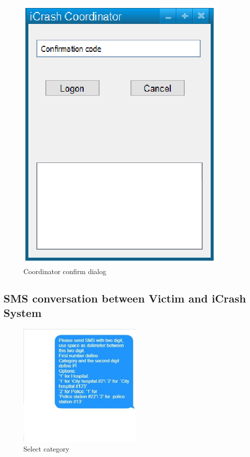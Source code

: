 \begin{figure}
  \centering
    \includegraphics{images/mockups/feature1-login/CoordinatorConfirm.eps}
  \caption{Coordinator confirm dialog}
  \label{fig:CoordinatorConfirm}
\end{figure}
\subsection{SMS conversation between Victim and iCrash System}

\begin{figure}
  \centering
    \includegraphics[width=6cm]{images/mockups/feature3-PI/iCrashSendsOptions.eps}
  \caption{Select category}
  \label{fig:Selectcategory}
\end{figure}


